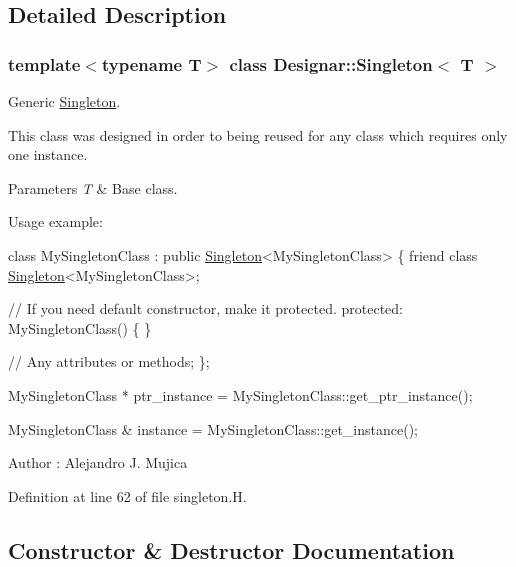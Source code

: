 \subsection{Detailed Description}
\subsubsection*{template$<$typename T$>$\newline
class Designar\+::\+Singleton$<$ T $>$}

Generic \hyperlink{class_designar_1_1_singleton}{Singleton}.

This class was designed in order to being reused for any class which requires only one instance.


\begin{DoxyParams}{Parameters}
{\em T} & Base class.\\
\hline
\end{DoxyParams}
Usage example\+:


\begin{DoxyCode}
\textcolor{keyword}{class }MySingletonClass : \textcolor{keyword}{public} \hyperlink{class_designar_1_1_singleton_ad2cc3d3b4ee614f4dd63bda386638f66}{Singleton}<MySingletonClass>
\{
  \textcolor{keyword}{friend} \textcolor{keyword}{class }\hyperlink{class_designar_1_1_singleton_ad2cc3d3b4ee614f4dd63bda386638f66}{Singleton}<MySingletonClass>;

  \textcolor{comment}{// If you need default constructor, make it protected.}
\textcolor{keyword}{protected}:
  MySingletonClass() \{ \}

  \textcolor{comment}{// Any attributes or methods;}
\};

MySingletonClass * ptr\_instance = MySingletonClass::get\_ptr\_instance();

MySingletonClass & instance = MySingletonClass::get\_instance();
\end{DoxyCode}


\begin{DoxyAuthor}{Author}
\+: Alejandro J. Mujica 
\end{DoxyAuthor}


Definition at line 62 of file singleton.\+H.



\subsection{Constructor \& Destructor Documentation}
\mbox{\label{class_designar_1_1_singleton_ad2cc3d3b4ee614f4dd63bda386638f66}} 
